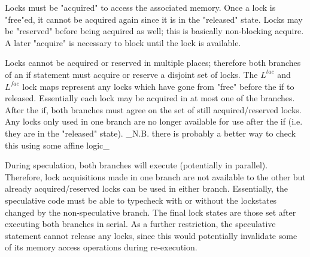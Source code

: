 \documentclass{article}
\begin{document}
Locks must be "acquired" to access the associated memory. Once a lock
is "free"ed, it cannot be acquired again since it is in the "released" state.
Locks may be "reserved" before being acquired as well; this is basically non-blocking
acquire. A later "acquire" is necessary to block until the lock is available.

Locks cannot be acquired or reserved in multiple places; therefore both
branches of an if statement must acquire or reserve a disjoint set of locks.
The $L^{tac}$ and $L^{fac}$ lock maps represent any locks which have gone from
"free" before the if to released. Essentially each lock may be acquired in at most
one of the branches. After the if, both branches must agree on the set of still
acquired/reserved locks. Any locks only used in one branch are no longer available
for use after the if (i.e. they are in the "released" state).
_N.B. there is probably a better way to check this using some affine logic_

During speculation, both branches will execute (potentially in parallel). Therefore,
lock acquisitions made in one branch are not available to the other but already acquired/reserved
locks can be used in either branch. Essentially, the speculative code must be able
to typecheck with or without the lockstates changed by the non-speculative branch.
The final lock states are those set after executing both branches in serial.
As a further restriction, the speculative statement
cannot release any locks, since this would potentially invalidate
some of its memory access operations during re-execution.
\end{document}
